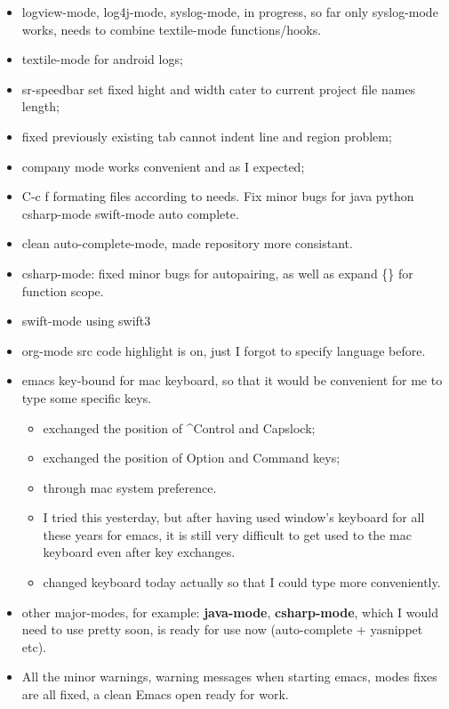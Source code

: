 \documentclass[9pt, b5paper]{article}
\begin{document}
\begin{itemize}
\item logview-mode, log4j-mode, syslog-mode, in progress, so far only syslog-mode works, needs to combine textile-mode functions/hooks.
\item textile-mode for android logs;
\item sr-speedbar set fixed hight and width cater to current project file names length;
\item fixed previously existing tab cannot indent line and region problem;
\item company mode works convenient and as I expected;
\item C-c f formating files according to needs. Fix minor bugs for java python csharp-mode swift-mode auto complete.
\item clean auto-complete-mode, made repository more consistant.
\item csharp-mode: fixed minor bugs for autopairing, as well as expand \{\} for function scope.
\item swift-mode using swift3
\item org-mode src code highlight is on, just I forgot to specify language before.
\item emacs key-bound for mac keyboard, so that it would be convenient for me to type some specific keys. 
\begin{itemize}
\item exchanged the position of \^{}Control and Capslock;
\item exchanged the position of Option and Command keys;
\item through mac system preference.
\item I tried this yesterday, but after having used window's keyboard for all these years for emacs, it is still very difficult to get used to the mac keyboard even after key exchanges.
\item changed keyboard today actually so that I could type more conveniently.
\end{itemize}
\item other major-modes, for example: \textbf{java-mode}, \textbf{csharp-mode}, which I would need to use pretty soon, is ready for use now (auto-complete + yasnippet etc).
\item All the minor warnings, warning messages when starting emacs, modes fixes are all fixed, a clean Emacs open ready for work.
\end{itemize}
\end{document}
